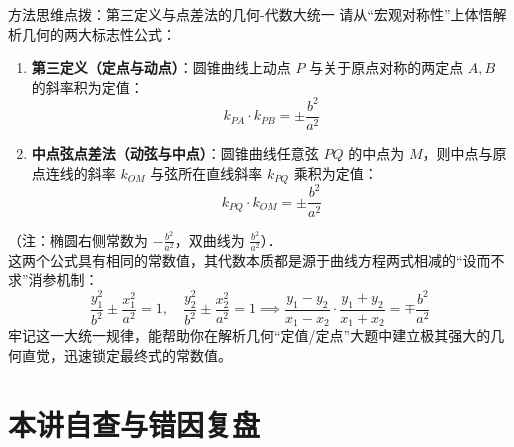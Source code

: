 \documentclass[11pt,a4paper]{ctexart}
\begin{document}
\vspace{0.8em}

\begin{theorembox}{方法思维点拨：第三定义与点差法的几何-代数大统一}
请从“宏观对称性”上体悟解析几何的两大标志性公式：
\begin{enumerate}
  \item \textbf{第三定义（定点与动点）}：圆锥曲线上动点 $P$ 与关于原点对称的两定点 $A, B$ 的斜率积为定值：
        \[ k_{PA} \cdot k_{PB} = \pm \frac{b^2}{a^2} \]
  \item \textbf{中点弦点差法（动弦与中点）}：圆锥曲线任意弦 $PQ$ 的中点为 $M$，则中点与原点连线的斜率 $k_{OM}$ 与弦所在直线斜率 $k_{PQ}$ 乘积为定值：
        \[ k_{PQ} \cdot k_{OM} = \pm \frac{b^2}{a^2} \]
\end{enumerate}
（注：椭圆右侧常数为 $-\frac{b^2}{a^2}$，双曲线为 $\frac{b^2}{a^2}$）．\\
这两个公式具有相同的常数值，其代数本质都是源于曲线方程两式相减的“设而不求”消参机制：
\[ \frac{y_1^2}{b^2} \pm \frac{x_1^2}{a^2} = 1, \quad \frac{y_2^2}{b^2} \pm \frac{x_2^2}{a^2} = 1 \implies \frac{y_1-y_2}{x_1-x_2} \cdot \frac{y_1+y_2}{x_1+x_2} = \mp \frac{b^2}{a^2} \]
牢记这一大统一规律，能帮助你在解析几何“定值/定点”大题中建立极其强大的几何直觉，迅速锁定最终式的常数值。
\end{theorembox}

\freequestionheader
{\small \qConicDefThreeSlopeProofStem}
\begin{center}
  \qConicDefThreeSlopeProofFigure
\end{center}

\newpage

\freequestionheader
{\small \qConicDefThreeCircleStem}
\begin{center}
  \qConicDefThreeCircleFigure
\end{center}

\freequestionheader
{\small \qConicDefThreeEllipseSymmetryStem}
\begin{center}
  \qConicDefThreeEllipseSymmetryFigure
\end{center}

\newpage

\section{本讲自查与错因复盘}
\end{document}
